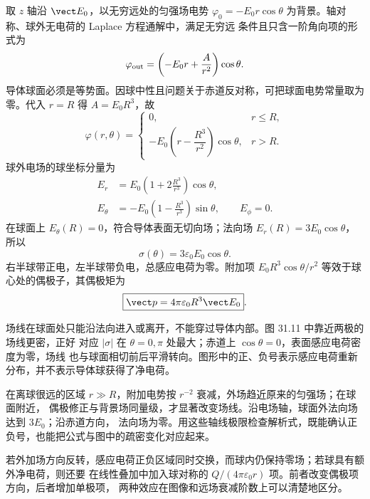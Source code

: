 \begin{xesolution}
取 $z$ 轴沿 $\vect E_0$，以无穷远处的匀强场电势
$\varphi_0=-E_0r\cos\theta$ 为背景。轴对称、球外无电荷的 Laplace 方程通解中，满足无穷远
条件且只含一阶角向项的形式为
\[
  \varphi_{\rm out}=\left(-E_0r+\frac{A}{r^2}\right)\cos\theta.
\]
导体球面必须是等势面。因球中性且问题关于赤道反对称，可把球面电势常量取为零。代入 $r=R$
得 $A=E_0R^3$，故
\begin{equation}
  \boxed{\varphi(r,\theta)=
  \begin{cases}
  0,&r\le R,\\[3pt]
  -E_0\left(r-\dfrac{R^3}{r^2}\right)\cos\theta,&r>R.
  \end{cases}}
\end{equation}
球外电场的球坐标分量为
\begin{align*}
  \boxed{E_r}&=\boxed{E_0\left(1+2\frac{R^3}{r^3}\right)\cos\theta},\\
  \boxed{E_\theta}&=\boxed{-E_0\left(1-\frac{R^3}{r^3}\right)\sin\theta},
  \qquad E_\phi=0.
\end{align*}
在球面上 $E_\theta(R)=0$，符合导体表面无切向场；法向场
$E_r(R)=3E_0\cos\theta$，所以
\begin{equation}
  \boxed{\sigma(\theta)=3\varepsilon_0E_0\cos\theta}.
\end{equation}
右半球带正电，左半球带负电，总感应电荷为零。附加项
$E_0R^3\cos\theta/r^2$ 等效于球心处的偶极子，其偶极矩为
\begin{equation}
  \boxed{\vect p=4\pi\varepsilon_0R^3\vect E_0}.
\end{equation}

场线在球面处只能沿法向进入或离开，不能穿过导体内部。图 31.11 中靠近两极的场线更密，正好
对应 $|\sigma|$ 在 $\theta=0,\pi$ 处最大；赤道上 $\cos\theta=0$，表面感应电荷密度为零，场线
也与球面相切前后平滑转向。图形中的正、负号表示感应电荷重新分布，并不表示导体球获得了净电荷。

在离球很远的区域 $r\gg R$，附加电势按 $r^{-2}$ 衰减，外场趋近原来的匀强场；在球面附近，
偶极修正与背景场同量级，才显著改变场线。沿电场轴，球面外法向场达到 $3E_0$；沿赤道方向，
法向场为零。用这些轴线极限检查解析式，既能确认正负号，也能把公式与图中的疏密变化对应起来。

若外加场方向反转，感应电荷正负区域同时交换，而球内仍保持零场；若球具有额外净电荷，则还要
在线性叠加中加入球对称的 $Q/(4\pi\varepsilon_0r)$ 项。前者改变偶极项方向，后者增加单极项，
两种效应在图像和远场衰减阶数上可以清楚地区分。

\uniformFieldSphereDiagram


\end{xesolution}
